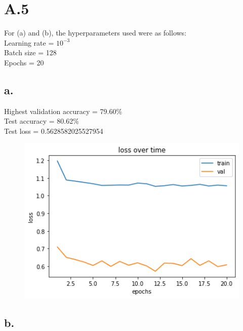 \documentclass{article}
\newcommand{\1}{\mathbf{1}}
\begin{document}
\newpage
\section*{A.5}
{\Large 

For (a) and (b), the hyperparameters used were as follows: \\
Learning rate = $10^{-3}$ \\
Batch size = 128 \\
Epochs = 20

\subsection*{a.}

Highest validation accuracy = 79.60\% \\
Test accuracy = 80.62\% \\
Test loss = 0.5628582025527954

\begin{figure}[h]
  \centering
  \includegraphics[width=150mm]{../hw3-code/results/a5/a5_a.png}
\end{figure}

\newpage

\subsection*{b.}

}
\end{document}
